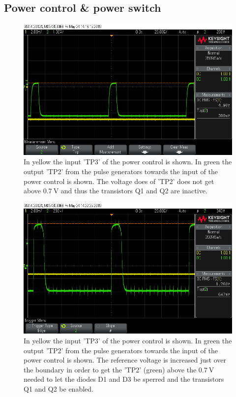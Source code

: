 \subsection{Power control \& power switch}


\begin{figure}[H]
\centering
\includegraphics[width=.9\textwidth]{figures/scope_16.png}
\caption{In yellow the input 'TP3' of the power control is shown. In green the output 'TP2' from the pulse generators towards the input of the power control is shown. The voltage does of 'TP2' does not get above $\SI{0.7}{\volt}$ and thus the transistors Q1 and Q2 are inactive.}
\label{fig:scope_16}
\end{figure}


\begin{figure}[H]
\centering
\includegraphics[width=.9\textwidth]{figures/scope_17.png}
\caption{In yellow the input 'TP3' of the power control is shown. In green the output 'TP2' from the pulse generators towards the input of the power control is shown. The reference voltage is increased just over the boundary in order to get the 'TP2' (green) above the $\SI{0.7}{\volt}$ needed to let the diodes D1 and D3 be sperred and the transistors Q1 and Q2 be enabled.}
\label{fig:scope_17}
\end{figure}


